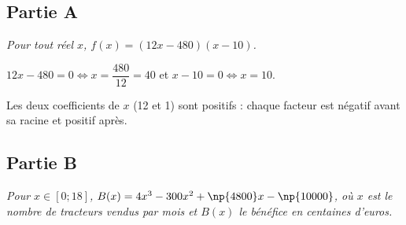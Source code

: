 \subsection*{Partie A}

\emph{Pour tout réel $x$, $f(x) = (12x - 480)(x - 10)$.}

$12x - 480 = 0 \iff x = \dfrac{480}{12} = 40$ \quad et \quad $x - 10 = 0 \iff x = 10$.

Les deux coefficients de $x$ (12 et 1) sont positifs : chaque
facteur est négatif avant sa racine et positif après.

\begin{center}
\end{center}


\subsection*{Partie B}

\emph{Pour $x \in [0 ; 18]$, $B(x) = 4x^3 - 300x^2 + \np{4800}x - \np{10000}$, où $x$ est le nombre de
tracteurs vendus par mois et $B(x)$ le bénéfice en centaines d'euros.}

